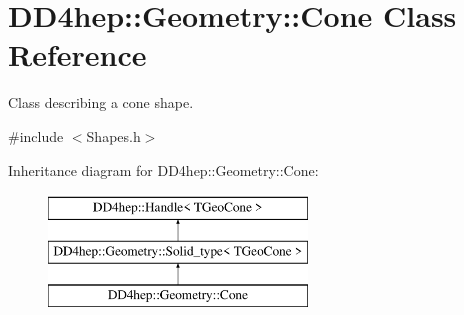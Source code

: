 \hypertarget{class_d_d4hep_1_1_geometry_1_1_cone}{}\section{D\+D4hep\+:\+:Geometry\+:\+:Cone Class Reference}
\label{class_d_d4hep_1_1_geometry_1_1_cone}


Class describing a cone shape.  




{\ttfamily \#include $<$Shapes.\+h$>$}

Inheritance diagram for D\+D4hep\+:\+:Geometry\+:\+:Cone\+:\begin{figure}[H]
\begin{center}
\leavevmode
\includegraphics[height=3.000000cm]{class_d_d4hep_1_1_geometry_1_1_cone}
\end{center}
\end{figure}
